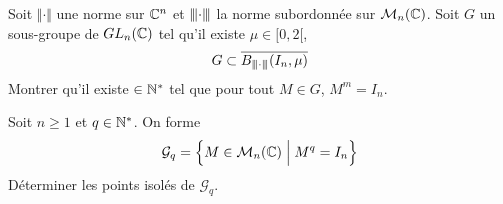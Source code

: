 \documentclass[12pt]{article}
\begin{document}
\begin{exercise}
	Soit $\Vert\cdot\Vert$ une norme sur $\mathbb{C}^{n}$ et ${\left\vert\kern-0.25ex\left\vert\kern-0.25ex\left\vert{}\cdot \right\vert\kern-0.25ex\right\vert\kern-0.25ex\right\vert}$ la norme subordonnée sur $\mathcal{M}_{n}(\mathbb{C})$. Soit $G$ un sous-groupe de $GL_{n}(\mathbb{C})$ tel qu'il existe $\mu\in[0,2[$,
	$$G\subset\overline{B_{{\left\vert\kern-0.25ex\left\vert\kern-0.25ex\left\vert{}\cdot \right\vert\kern-0.25ex\right\vert\kern-0.25ex\right\vert}}(I_{n},\mu)}$$
	Montrer qu'il existe $\in\mathbb{N}^{*}$ tel que pour tout $M\in G$, $M^{m}=I_{n}$.
\end{exercise}

\begin{exercise}
	Soit $n\geqslant1$ et $q\in\mathbb{N}^{*}$. On forme 
	$$\mathcal{G}_{q}=\Bigl\{M\in\mathcal{M}_{n}(\mathbb{C})\Bigm| M^{q}=I_{n}\Bigr\}$$
	Déterminer les points isolés de $\mathcal{G}_{q}$.
\end{exercise}
\end{document}
